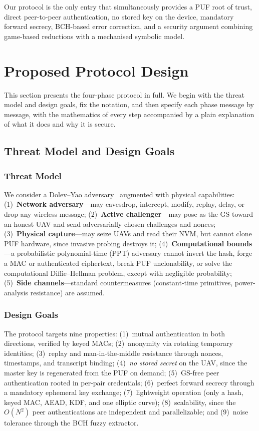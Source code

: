 \documentclass[11pt,a4paper]{article}
\begin{document}
Our protocol is the only entry that simultaneously provides a PUF root of
trust, direct peer-to-peer authentication, no stored key on the device,
mandatory forward secrecy, BCH-based error correction, and a security argument
combining game-based reductions with a mechanised symbolic model.

\section{Proposed Protocol Design}
\label{sec:protocol}

This section presents the four-phase protocol in full. We begin with the
threat model and design goals, fix the notation, and then specify each phase
message by message, with the mathematics of every step accompanied by a plain
explanation of what it does and why it is secure.

\subsection{Threat Model and Design Goals}

\subsubsection{Threat Model}
We consider a Dolev--Yao adversary~\cite{dolev_yao} augmented with physical
capabilities: (1)~\textbf{Network adversary}---may eavesdrop, intercept,
modify, replay, delay, or drop any wireless message; (2)~\textbf{Active
challenger}---may pose as the GS toward an honest UAV and send
adversarially chosen challenges and nonces; (3)~\textbf{Physical
capture}---may seize UAVs and read their NVM, but cannot clone PUF hardware,
since invasive probing destroys it; (4)~\textbf{Computational bounds}---a
probabilistic polynomial-time (PPT) adversary cannot invert the hash, forge a
MAC or authenticated ciphertext, break PUF unclonability, or solve the
computational Diffie--Hellman problem, except with negligible probability;
(5)~\textbf{Side channels}---standard countermeasures (constant-time
primitives, power-analysis resistance) are assumed.

\subsubsection{Design Goals}
The protocol targets nine properties: (1)~mutual authentication in both
directions, verified by keyed MACs; (2)~anonymity via rotating temporary
identities; (3)~replay and man-in-the-middle resistance through nonces,
timestamps, and transcript binding; (4)~\emph{no stored secret} on the UAV,
since the master key is regenerated from the PUF on demand; (5)~GS-free peer
authentication rooted in per-pair credentials; (6)~perfect forward secrecy
through a mandatory ephemeral key exchange; (7)~lightweight operation (only a
hash, keyed MAC, AEAD, KDF, and one elliptic curve); (8)~scalability, since
the $O(N^2)$ peer authentications are independent and parallelizable; and
(9)~noise tolerance through the BCH fuzzy extractor.
\end{document}
